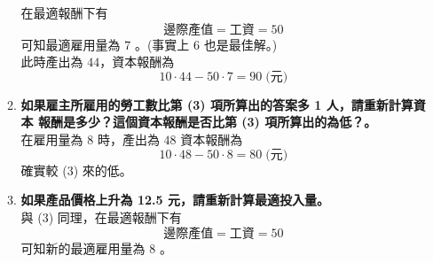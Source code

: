 \documentclass[12pt, a4paper]{article}
\begin{document}
\begin{enumerate}[label={\bf 8.\arabic*}]
\begin{enumerate}[label={\bf (\arabic*)}]
        在最適報酬下有
        \[ \text{邊際產值} = \text{工資} = 50 \]
        可知最適雇用量為 $7$ 。(事實上 $6$ 也是最佳解。)\\
        此時產出為 $44$，資本報酬為
        \[ 10 \cdot 44 - 50 \cdot 7 = 90 \;\text{(元)}\]
      \item {\bf 如果雇主所雇用的勞工數比第 (3) 項所算出的答案多 1 人，請重新計算資本
          報酬是多少？這個資本報酬是否比第 (3) 項所算出的為低？。\\[10pt]} 
        在雇用量為 $8$ 時，產出為 $48$
        資本報酬為
        \[ 10 \cdot 48 - 50 \cdot 8 = 80 \;\text{(元)}\]
        確實較 (3) 來的低。
      \item {\bf 如果產品價格上升為 12.5 元，請重新計算最適投入量。\\[10pt]} 
        與 (3) 同理，在最適報酬下有
        \[ \text{邊際產值} = \text{工資} = 50 \]
        可知新的最適雇用量為 $8$ 。\\
    \end{enumerate}
\end{enumerate}
\end{document}

